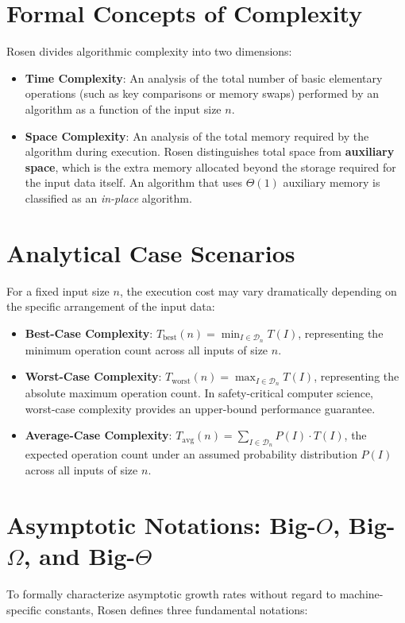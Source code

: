 \documentclass[11pt,a4paper,oneside]{report}
\theoremstyle{definition}
\begin{document}
\section{Formal Concepts of Complexity}
Rosen \cite[\S3.3]{Rosen2019} divides algorithmic complexity into two dimensions:
\begin{itemize}
    \item \textbf{Time Complexity}: An analysis of the total number of basic elementary operations (such as key comparisons or memory swaps) performed by an algorithm as a function of the input size $n$.
    \item \textbf{Space Complexity}: An analysis of the total memory required by the algorithm during execution. Rosen distinguishes total space from \textbf{auxiliary space}, which is the extra memory allocated beyond the storage required for the input data itself. An algorithm that uses $\Theta(1)$ auxiliary memory is classified as an \emph{in-place} algorithm.
\end{itemize}

\section{Analytical Case Scenarios}
For a fixed input size $n$, the execution cost may vary dramatically depending on the specific arrangement of the input data:
\begin{itemize}
    \item \textbf{Best-Case Complexity}: $T_{\text{best}}(n) = \min_{I \in \mathcal{D}_n} T(I)$, representing the minimum operation count across all inputs of size $n$.
    \item \textbf{Worst-Case Complexity}: $T_{\text{worst}}(n) = \max_{I \in \mathcal{D}_n} T(I)$, representing the absolute maximum operation count. In safety-critical computer science, worst-case complexity provides an upper-bound performance guarantee.
    \item \textbf{Average-Case Complexity}: $T_{\text{avg}}(n) = \sum_{I \in \mathcal{D}_n} P(I) \cdot T(I)$, the expected operation count under an assumed probability distribution $P(I)$ across all inputs of size $n$.
\end{itemize}

\section{Asymptotic Notations: Big-\texorpdfstring{$O$}{O}, Big-\texorpdfstring{$\Omega$}{Omega}, and Big-\texorpdfstring{$\Theta$}{Theta}}
To formally characterize asymptotic growth rates without regard to machine-specific constants, Rosen \cite[\S3.2]{Rosen2019} defines three fundamental notations:
\end{document}
